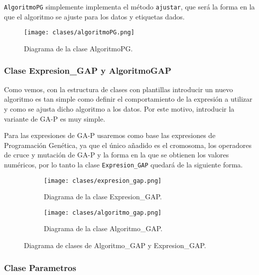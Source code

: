 \texttt{AlgoritmoPG} simplemente implementa el método \texttt{ajustar}, que será la forma en la que el algoritmo se ajuste para los datos y etiquetas dados.


\begin{figure}[H]
	 \centering
	 \texttt{[image: clases/algoritmoPG.png]}
	 \caption{Diagrama de la clase AlgoritmoPG.}
	\label{fig:diagrama_clase_algoritmoPG}
\end{figure}

\newpage

\subsubsection{Clase Expresion\_GAP y AlgoritmoGAP}

Como vemos, con la estructura de clases con plantillas introducir un nuevo algoritmo es tan simple como definir el comportamiento de la expresión a utilizar y como se ajusta dicho algoritmo a los datos. Por este motivo, introducir la variante de GA-P es muy simple.

Para las expresiones de GA-P usaremos como base las expresiones de Programación Genética, ya que el único añadido es el cromosoma, los operadores de cruce y mutación de GA-P y la forma en la que se obtienen los valores numéricos, por lo tanto la clase \texttt{Expresion\_GAP} quedará de la siguiente forma.



\begin{figure}[H]
    \centering
	 \begin{subfigure}[b]{0.49\textwidth}
		 \centering
		 \texttt{[image: clases/expresion\_gap.png]}
		 \caption{Diagrama de la clase Expresion\_GAP.}
		\label{fig:diagrama_clase_expresion_gap}
	 \end{subfigure}
	\begin{subfigure}[b]{0.49\textwidth}
		 \centering
		 \texttt{[image: clases/algoritmo\_gap.png]}
 		\caption{Diagrama de la clase Algoritmo\_GAP.}
 	  \label{fig:diagrama_clase_algoritmo_gap}
   \end{subfigure}

	\caption{Diagrama de clases de Algoritmo\_GAP y Expresion\_GAP.}
	\label{fig:diagrama_clases_gap}
\end{figure}


\subsubsection{Clase Parametros}

